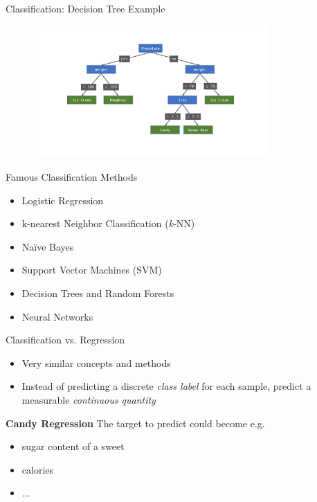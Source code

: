 \documentclass[aspectratio=169]{beamer}
\begin{document}
\begin{frame}{Classification: Decision Tree Example}
    \begin{figure}
        \centering
        \includegraphics[width=0.8\textwidth]{Figures/example_decision_tree.pdf}
    \end{figure}
\end{frame}

\begin{frame}{Famous Classification Methods}
    \begin{itemize}
        \item Logistic Regression
        \item k-nearest Neighbor Classification (\textit{k}-NN)
        \item Naïve Bayes
        \item Support Vector Machines (SVM)
        \item Decision Trees and Random Forests
        \item Neural Networks
    \end{itemize}
\end{frame}

\begin{frame}{Classification vs. Regression}
    \begin{itemize}
        \item Very similar concepts and methods
        \item Instead of predicting a discrete \textit{class label} for
          each sample, predict a measurable \textit{continuous quantity}
    \end{itemize}
    \vspace{0.5cm}
    \textbf{Candy Regression}\newline
    The target to predict could become e.g.
    \begin{itemize}
        \item sugar content of a sweet
        \item calories
        \item ...
    \end{itemize}
\end{frame}
\end{document}
